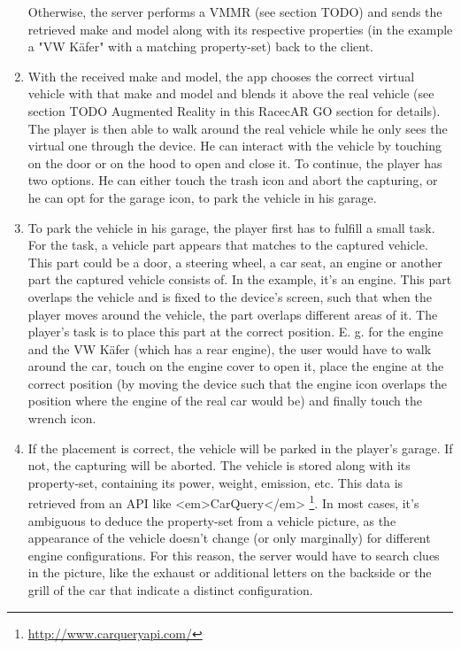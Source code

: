 \begin{enumerate}
Otherwise, the server performs a VMMR (see section TODO) and sends the retrieved make and model along with its respective properties (in the example a "VW K\"afer" with a matching property-set) back to the client.
  \item With the received make and model, the app chooses the correct virtual vehicle with that make and model and blends it above the real vehicle (see section TODO Augmented Reality in this RacecAR GO section for details).
The player is then able to walk around the real vehicle while he only sees the virtual one through the device. He can interact with the vehicle by touching on the door or on the hood to open and close it. To continue, the player has two options. He can either touch the trash icon and abort the capturing, or he can opt for the garage icon, to park the vehicle in his garage.
  \item To park the vehicle in his garage, the player first has to fulfill a small task. For the task, a vehicle part appears that matches to the captured vehicle. This part could be a door, a steering wheel, a car seat, an engine or another part the captured vehicle consists of. In the example, it’s an engine. This part overlaps the vehicle and is fixed to the device’s screen, such that when the player moves around the vehicle, the part overlaps different areas of it. The player's task is to place this part at the correct position. E. g. for the engine and the VW K\"afer (which has a rear engine), the user would have to walk around the car, touch on the engine cover to open it, place the engine at the correct position (by moving the device such that the engine icon overlaps the position where the engine of the real car would be) and finally touch the wrench icon.
  \item If the placement is correct, the vehicle will be parked in the player's garage. If not, the capturing will be aborted. The vehicle is stored along with its property-set, containing its power, weight, emission, etc. This data is retrieved from an API like <em>CarQuery</em> \footnote{\url{http://www.carqueryapi.com/}}. In most cases, it's ambiguous to deduce the property-set from a vehicle picture, as the appearance of the vehicle doesn’t change (or only marginally) for different engine configurations. For this reason, the server would have to search clues in the picture, like the exhaust or additional letters on the backside or the grill of the car that indicate a distinct configuration.
\end{enumerate}

